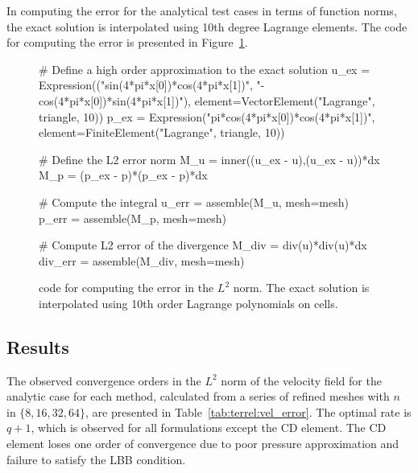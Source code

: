 In computing the error for the analytical test cases in terms of
function norms, the exact solution is interpolated using 10th degree
Lagrange elements. The code for computing the error is presented in
Figure~\ref{code:terrel:error}.

\begin{figure}
\begin{python}
# Define a high order approximation to the exact solution
u_ex = Expression(("sin(4*pi*x[0])*cos(4*pi*x[1])",
               "-cos(4*pi*x[0])*sin(4*pi*x[1])"),
               element=VectorElement("Lagrange", triangle, 10))
p_ex = Expression("pi*cos(4*pi*x[0])*cos(4*pi*x[1])",
               element=FiniteElement("Lagrange", triangle, 10))

# Define the L2 error norm
M_u = inner((u_ex - u),(u_ex - u))*dx
M_p = (p_ex - p)*(p_ex - p)*dx

# Compute the integral
u_err = assemble(M_u, mesh=mesh)
p_err = assemble(M_p, mesh=mesh)

# Compute L2 error of the divergence
M_div = div(u)*div(u)*dx
div_err = assemble(M_div, mesh=mesh)
\end{python}
\caption{\dolfin{} code for computing the error in the $L^{2}$ norm. The
exact solution is interpolated using 10th order Lagrange polynomials
on cells.}
\label{code:terrel:error}
\end{figure}
\subsection{Results}

The observed convergence orders in the $L^{2}$ norm of the velocity
field for the analytic case for each method, calculated from a series
of refined meshes with $n$ in $\{8, 16, 32, 64\}$, are presented in
Table~\ref{tab:terrel:vel_error}. The optimal rate is $q + 1$, which is
observed for all formulations except the CD element.  The CD element
loses one order of convergence due to poor pressure approximation and
failure to satisfy the LBB condition.

